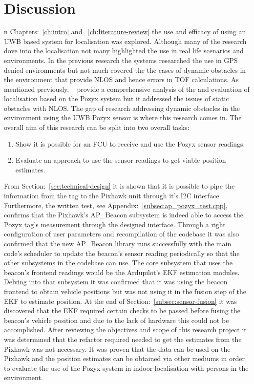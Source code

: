 \chapter{Discussion}\label{ch:discussion}
n Chapters:~\ref{ch:intro} and ~\ref{ch:literature-review} the use and efficacy of using an UWB based system for localisation was explored.
Although many of the research dove into the localisation not many highlighted the use in real life scenarios and environments.
In the previous research the systems researched the use in GPS denied environments but not much covered the the cases of dynamic obstacles in the environment that provide NLOS and hence errors in TOF calculations.
As mentioned previously, ~\citet{evaluwb} provide a comprehensive analysis of the and evaluation of localisation based on the Pozyx system but it addressed the issues of static obstacles with NLOS.
The gap of research addressing dynamic obstacles in the environment using the UWB Pozyx sensor is where this research comes in.
The overall aim of this research can be split into two overall tasks:
\begin{enumerate}
    \item Show it is possible for an FCU to receive and use the Pozyx sensor readings.
    \item Evaluate an approach to use the sensor readings to get viable position estimates.
\end{enumerate}

From Section:~\ref{sec:technical-design} it is shown that it is possible to pipe the information from the tag to the Pixhawk unit through it's I2C interface.
Furthermore, the written test, see Appendix:~\ref{subsec:ap_pozyx_test.cpp}, confirms that the Pixhawk's AP\_Beacon subsystem is indeed able to access the Pozyx tag's measurement through the designed interface.
Through a right configuration of user parameters and recompilation of the codebase it was also confirmed that the new AP\_Beacon library runs successfully with the main code's scheduler to update the beacon's sensor reading periodically so that the other subsystems in the codebase can use.
The core subsystem that uses the beacon's frontend readings would be the Ardupilot's EKF estimation modules.
Delving into that subsystem it was confirmed that it was using the beacon frontend to obtain vehicle positions but was not using it in the fusion step of the EKF to estimate position.
At the end of Section:~\ref{subsec:sensor-fusion} it was discovered that the EKF required certain checks to be passed before fusing the beacon's  vehicle position and due to the lack of hardware this could not be accomplished.
After reviewing the objectives and scope of this research project it was determined that the refactor required needed to get the estimates from the Pixhawk was not necessary.
It was proven that the data can be used on the Pixhawk and the position estimates can be obtained via other mediums in order to evaluate the use of the Pozyx system in indoor localisation with persons in the environment.

